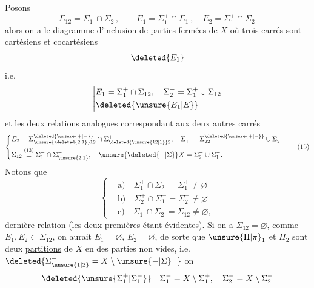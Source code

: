 \begingroup
\makeatletter\tagsleft@true\makeatother
Posons
\[
\Sigma_{12}=\Sigma_1^-\cap\Sigma_2^-,\qquad E_1=\Sigma_1^+\cap\Sigma_1^-,\quad E_2=\Sigma_1^+\cap\Sigma_2^-\tag*{(13)}
\]
alors on a le diagramme d'inclusion de parties fermées de $X$
\usetikzlibrary{decorations.pathmorphing}
où  trois carrés sont cartésiens et cocartésiens
\[
\deleted{E_1}
\]
i.e.
\[
\left|\begin{aligned}
&E_1=\Sigma_1^+\cap\Sigma_{12},\quad\Sigma_2^-=\Sigma_1^+\cup\Sigma_{12}\\
&\deleted{\unsure{E_1|E}}
\end{aligned}\right.
\]
et les deux relations analogues correspondant aux deux autres carrés
\[
\left\{\begin{aligned}
&E_2=\Sigma_{\unsure{\deleted{2|1}}12}^{\deleted{\unsure{+|-}}}\cap\Sigma_{\deleted{\unsure{12|1}}2}^+,\quad \Sigma_1^-=\Sigma_{22}^{\deleted{\unsure{+|-}}}\cup\Sigma_2^+\\
&\Sigma_{12}\overset{(13)}{\equiv}\Sigma_1^-\cap\Sigma_{\unsure{2|1}}^-,\quad \unsure{\deleted{{-}|\Sigma}}X=\Sigma_2^-\cup\Sigma_1^-.
\end{aligned}\right.\tag*{(15)}
\]
Notons que
\[
\left\{\begin{aligned}
&\text{a)}\quad\Sigma_1^+\cap\Sigma_2^-=\Sigma_1^+\ne\varnothing\\
&\text{b)}\quad\Sigma_2^+\cap\Sigma_1^-=\Sigma_2^+\ne\varnothing\\
&\text{c)}\quad\Sigma_1^-\cap\Sigma_2^-=\Sigma_{12}\ne\varnothing,
\end{aligned}\right.\tag*{(16)}
\]
  dernière relation (les deux premières étant évidentes).
Si on a $\Sigma_{12}=\varnothing$, comme $E_1,E_2\subset\Sigma_{12}$, on aurait $E_1=\varnothing$, $E_2=\varnothing$, de sorte que $\unsure{\Pi|\pi}_1$ et $\Pi_2$ sont deux \uline{partitions} de $X$ en des parties non vides, i.e. $\deleted{\Sigma_{\unsure{1|2}}^- = X\setminus{\unsure{{-}|\Sigma}}^-}$ on 
\[
\deleted{\unsure{\Sigma_1^+|\Sigma_1^-}}\quad\Sigma_1^-=X\setminus\Sigma_1^+,\quad\Sigma_2^-=X\setminus\Sigma_2^+
\]
\endgroup
